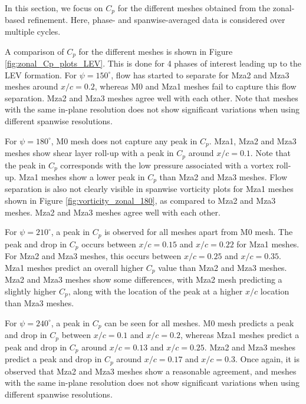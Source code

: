 
In this section, we focus on $C_p$ for the different meshes obtained from the zonal-based refinement.
Here, phase- and spanwise-averaged data is considered over multiple cycles.

A comparison of $C_p$ for the different meshes is shown in Figure \ref{fig:zonal_Cp_plots_LEV}. This is done for 4 phases of interest leading up to the LEV formation. 
For $\psi=150^\circ$, flow has started to separate for Mza2 and Mza3 meshes around $x/c = 0.2$, whereas M0 and Mza1 meshes fail to capture this flow separation. 
Mza2 and Mza3 meshes agree well with each other. 
Note that meshes with the same in-plane resolution does not show significant variations when using different spanwise resolutions.

 
For $\psi=180^\circ$, M0 mesh does not capture any peak in $C_p$.
Mza1, Mza2 and Mza3 meshes show shear layer roll-up with a peak in $C_p$ around $x/c = 0.1$.
Note that the peak in $C_p$ corresponds with the low pressure associated with a vortex roll-up.
Mza1 meshes show a lower peak in $C_p$ than Mza2 and Mza3 meshes. 
Flow separation is also not clearly visible in spanwise vorticity plots for Mza1 meshes shown in Figure \ref{fig:vorticity_zonal_180}, as compared to Mza2 and Mza3 meshes.
Mza2 and Mza3 meshes agree well with each other.


For $\psi=210^\circ$, a peak in $C_p$ is observed for all meshes apart from M0 mesh.
The peak and drop in $C_p$ occurs between $x/c=0.15$ and $x/c=0.22$ for Mza1 meshes. 
For Mza2 and Mza3 meshes, this occurs between $x/c=0.25$ and $x/c=0.35$. Mza1 meshes predict an overall higher $C_p$ value than Mza2 and Mza3 meshes.
Mza2 and Mza3 meshes show some differences, with Mza2 mesh predicting a slightly higher $C_p$, along with the location of the peak at a higher $x/c$ location than Mza3 meshes.

For $\psi=240^\circ$, a peak in $C_p$ can be seen for all meshes.
M0 mesh predicts a peak and drop in $C_p$ between $x/c=0.1$ and $x/c=0.2$, whereas Mza1 meshes predict a peak and drop in $C_p$ around $x/c=0.13$ and $x/c=0.25$. 
Mza2 and Mza3 meshes predict a peak and drop in $C_p$ around $x/c=0.17$ and $x/c=0.3$. 
Once again, it is observed that Mza2 and Mza3 meshes show a reasonable agreement, and meshes with the same in-plane resolution does not show significant variations when using different spanwise resolutions.


